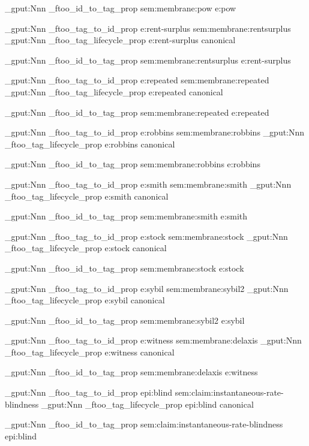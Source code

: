 \prop_gput:Nnn \g_ftoo_id_to_tag_prop { sem:membrane:pow } { e:pow }


\prop_gput:Nnn \g_ftoo_tag_to_id_prop { e:rent-surplus } { sem:membrane:rentsurplus }
\prop_gput:Nnn \g_ftoo_tag_lifecycle_prop { e:rent-surplus } { canonical }

\prop_gput:Nnn \g_ftoo_id_to_tag_prop { sem:membrane:rentsurplus } { e:rent-surplus }


\prop_gput:Nnn \g_ftoo_tag_to_id_prop { e:repeated } { sem:membrane:repeated }
\prop_gput:Nnn \g_ftoo_tag_lifecycle_prop { e:repeated } { canonical }

\prop_gput:Nnn \g_ftoo_id_to_tag_prop { sem:membrane:repeated } { e:repeated }


\prop_gput:Nnn \g_ftoo_tag_to_id_prop { e:robbins } { sem:membrane:robbins }
\prop_gput:Nnn \g_ftoo_tag_lifecycle_prop { e:robbins } { canonical }

\prop_gput:Nnn \g_ftoo_id_to_tag_prop { sem:membrane:robbins } { e:robbins }


\prop_gput:Nnn \g_ftoo_tag_to_id_prop { e:smith } { sem:membrane:smith }
\prop_gput:Nnn \g_ftoo_tag_lifecycle_prop { e:smith } { canonical }

\prop_gput:Nnn \g_ftoo_id_to_tag_prop { sem:membrane:smith } { e:smith }


\prop_gput:Nnn \g_ftoo_tag_to_id_prop { e:stock } { sem:membrane:stock }
\prop_gput:Nnn \g_ftoo_tag_lifecycle_prop { e:stock } { canonical }

\prop_gput:Nnn \g_ftoo_id_to_tag_prop { sem:membrane:stock } { e:stock }


\prop_gput:Nnn \g_ftoo_tag_to_id_prop { e:sybil } { sem:membrane:sybil2 }
\prop_gput:Nnn \g_ftoo_tag_lifecycle_prop { e:sybil } { canonical }

\prop_gput:Nnn \g_ftoo_id_to_tag_prop { sem:membrane:sybil2 } { e:sybil }


\prop_gput:Nnn \g_ftoo_tag_to_id_prop { e:witness } { sem:membrane:delaxis }
\prop_gput:Nnn \g_ftoo_tag_lifecycle_prop { e:witness } { canonical }

\prop_gput:Nnn \g_ftoo_id_to_tag_prop { sem:membrane:delaxis } { e:witness }


\prop_gput:Nnn \g_ftoo_tag_to_id_prop { epi:blind } { sem:claim:instantaneous-rate-blindness }
\prop_gput:Nnn \g_ftoo_tag_lifecycle_prop { epi:blind } { canonical }

\prop_gput:Nnn \g_ftoo_id_to_tag_prop { sem:claim:instantaneous-rate-blindness } { epi:blind }


